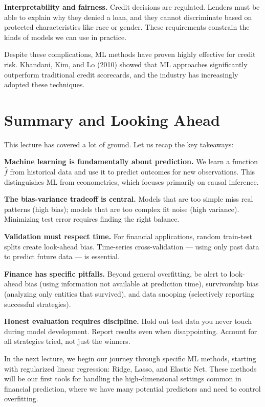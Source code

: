 \documentclass[11pt,a4paper]{article}
\begin{document}
\textbf{Interpretability and fairness.} Credit decisions are regulated. Lenders must be able to explain why they denied a loan, and they cannot discriminate based on protected characteristics like race or gender. These requirements constrain the kinds of models we can use in practice.

Despite these complications, ML methods have proven highly effective for credit risk. Khandani, Kim, and Lo (2010) showed that ML approaches significantly outperform traditional credit scorecards, and the industry has increasingly adopted these techniques.

\section{Summary and Looking Ahead}

This lecture has covered a lot of ground. Let us recap the key takeaways:

\textbf{Machine learning is fundamentally about prediction.} We learn a function $\widehat{f}$ from historical data and use it to predict outcomes for new observations. This distinguishes ML from econometrics, which focuses primarily on causal inference.

\textbf{The bias-variance tradeoff is central.} Models that are too simple miss real patterns (high bias); models that are too complex fit noise (high variance). Minimizing test error requires finding the right balance.

\textbf{Validation must respect time.} For financial applications, random train-test splits create look-ahead bias. Time-series cross-validation — using only past data to predict future data — is essential.

\textbf{Finance has specific pitfalls.} Beyond general overfitting, be alert to look-ahead bias (using information not available at prediction time), survivorship bias (analyzing only entities that survived), and data snooping (selectively reporting successful strategies).

\textbf{Honest evaluation requires discipline.} Hold out test data you never touch during model development. Report results even when disappointing. Account for all strategies tried, not just the winners.

In the next lecture, we begin our journey through specific ML methods, starting with regularized linear regression: Ridge, Lasso, and Elastic Net. These methods will be our first tools for handling the high-dimensional settings common in financial prediction, where we have many potential predictors and need to control overfitting. 
\end{document}
